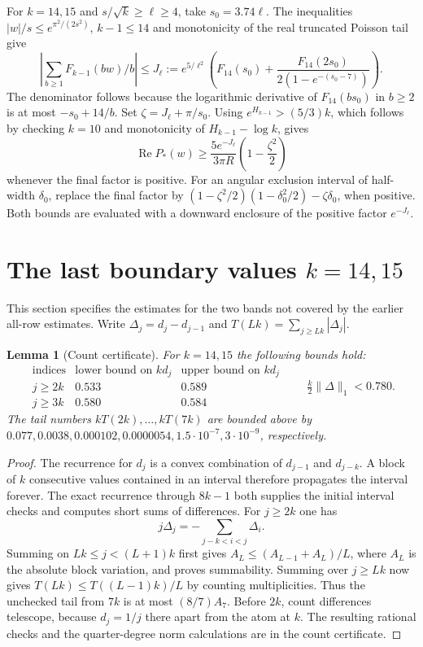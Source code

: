 \documentclass[11pt,reqno]{amsart}
\newtheorem{lemma}[theorem]{Lemma}
\theoremstyle{remark}
\DeclareMathOperator{\Rea}{Re}
\begin{document}
For $k=14,15$ and $s/\sqrt{k}\ge \ell\ge4$, take $s_0=3.74\ell$. The inequalities $|w|/s\le e^{\pi^2/(2s^2)}$, $k-1\le14$ and monotonicity of the real truncated Poisson tail give
\[
 \left|\sum_{b\ge1}F_{k-1}(bw)/b\right|
 \le J_\ell
 :=e^{5/\ell^2}\left(F_{14}(s_0)+
 \frac{F_{14}(2s_0)}{2(1-e^{-(s_0-7)})}\right).
\]
The denominator follows because the logarithmic derivative of $F_{14}(bs_0)$ in $b\ge2$ is at most $-s_0+14/b$. Set $\zeta=J_\ell+\pi/s_0$. Using $e^{H_{k-1}}>(5/3)k$, which follows by checking $k=10$ and monotonicity of $H_{k-1}-\log k$, gives
\begin{equation}\label{eq:poissonlower}
 \Rea P_*(w)\ge
 \frac{5e^{-J_\ell}}{3\pi R}\left(1-\frac{\zeta^2}{2}\right)
\end{equation}
whenever the final factor is positive. For an angular exclusion interval of half-width $\delta_0$, replace the final factor by
$(1-\zeta^2/2)(1-\delta_0^2/2)-\zeta\delta_0$, when positive. Both bounds are evaluated with a downward enclosure of the positive factor $e^{-J_\ell}$.

\section{The last boundary values $k=14,15$}\label{sec:last}
This section specifies the estimates for the two bands not covered by the earlier all-row estimates. Write $\Delta_j=d_j-d_{j-1}$ and $T(Lk)=\sum_{j\ge Lk}|\Delta_j|$.

\begin{lemma}[Count certificate]\label{lem:counts}
For $k=14,15$ the following bounds hold:
\[
 \begin{array}{c|cc}
  \text{indices}&\text{lower bound on }kd_j&\text{upper bound on }kd_j\\ \hline
   j\ge2k&0.533&0.589\\
   j\ge3k&0.580&0.584
 \end{array}
 \qquad \tfrac{k}{2}\|\Delta\|_1<0.780.
\]
The tail numbers $kT(2k),\ldots,kT(7k)$ are bounded above by
$0.077,0.0038,0.000102,0.0000054,1.5\cdot10^{-7},3\cdot10^{-9}$, respectively.
\end{lemma}
\begin{proof}
The recurrence for $d_j$ is a convex combination of $d_{j-1}$ and $d_{j-k}$. A block of $k$ consecutive values contained in an interval therefore propagates the interval forever. The exact recurrence through $8k-1$ both supplies the initial interval checks and computes short sums of differences. For $j\ge2k$ one has
\[
 j\Delta_j=-\sum_{j-k<i<j}\Delta_i.
\]
Summing on $Lk\le j<(L+1)k$ first gives $A_L\le(A_{L-1}+A_L)/L$, where $A_L$ is the absolute block variation, and proves summability. Summing over $j\ge Lk$ now gives $T(Lk)\le T((L-1)k)/L$ by counting multiplicities. Thus the unchecked tail from $7k$ is at most $(8/7)A_7$. Before $2k$, count differences telescope, because $d_j=1/j$ there apart from the atom at $k$. The resulting rational checks and the quarter-degree norm calculations are in the count certificate.
\end{proof}
\end{document}

